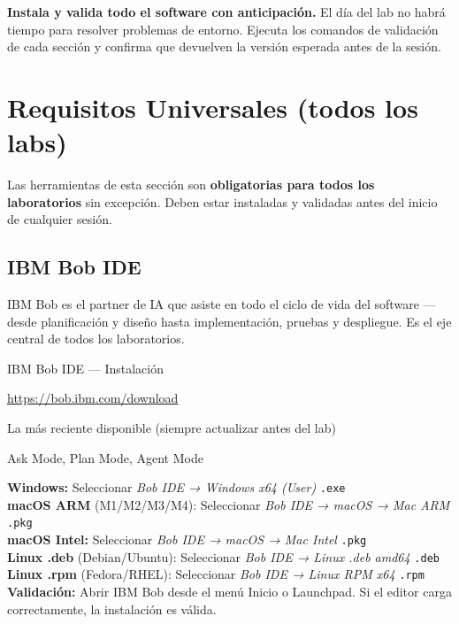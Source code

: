 \documentclass[11pt, a4paper]{article}
\newcommand{\req}[1]{\textbf{\textcolor{ibmred}{#1}}}
\newcommand{\checkmark}{\textcolor{ibmgreen}{\faCheckCircle}}
\begin{document}
\begin{warningbox}
  \textbf{Instala y valida todo el software con anticipación.} El día del lab no habrá tiempo para resolver problemas de entorno. Ejecuta los comandos de validación de cada sección y confirma que devuelven la versión esperada antes de la sesión.
\end{warningbox}

\tableofcontents
\newpage

\section{Requisitos Universales (todos los labs)}

Las herramientas de esta sección son \req{obligatorias para todos los laboratorios} sin excepción. Deben estar instaladas y validadas antes del inicio de cualquier sesión.

\subsection{IBM Bob IDE}

IBM Bob es el partner de IA que asiste en todo el ciclo de vida del software — desde planificación y diseño hasta implementación, pruebas y despliegue. Es el eje central de todos los laboratorios.

\begin{labbox}[ibmblue]{\faRobot\quad IBM Bob IDE — Instalación}
\begin{description}[leftmargin=3cm, style=nextline]
  \item[Descarga] \url{https://bob.ibm.com/download}
  \item[Versión] La más reciente disponible (siempre actualizar antes del lab)
  \item[Modos requeridos] Ask Mode, Plan Mode, Agent Mode
\end{description}
\vspace{6pt}
\textbf{Windows:} Seleccionar \emph{Bob IDE → Windows x64 (User)} \quad \texttt{.exe}\\
\textbf{macOS ARM} (M1/M2/M3/M4): Seleccionar \emph{Bob IDE → macOS → Mac ARM} \quad \texttt{.pkg}\\
\textbf{macOS Intel:} Seleccionar \emph{Bob IDE → macOS → Mac Intel} \quad \texttt{.pkg}\\
\textbf{Linux .deb} (Debian/Ubuntu): Seleccionar \emph{Bob IDE → Linux .deb amd64} \quad \texttt{.deb}\\
\textbf{Linux .rpm} (Fedora/RHEL): Seleccionar \emph{Bob IDE → Linux RPM x64} \quad \texttt{.rpm}
\vspace{6pt}\\
\textbf{Validación:} Abrir IBM Bob desde el menú Inicio o Launchpad. Si el editor carga correctamente, la instalación es válida. \checkmark
\end{labbox}
\end{document}
